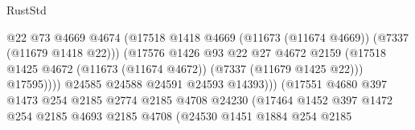\begin{lexlean}{RustStd}
\begin{coremodule}
                                                @22
                                                @73
                                                @4669
                                                @4674
                                                (@17518
                                                  @1418
                                                  @4669
                                                  (@11673 (@11674 @4669))
                                                  (@7337 (@11679 @1418 @22)))
                                                (@17576
                                                  @1426
                                                  @93
                                                  @22
                                                  @27
                                                  @4672
                                                  @2159
                                                  (@17518
                                                    @1425
                                                    @4672
                                                    (@11673 (@11674 @4672))
                                                    (@7337 (@11679 @1425 @22)))
                                                  @17595))))
                                          @24585
                                          @24588
                                          @24591
                                          @24593
                                          @14393)))
                                    (@17551
                                      @4680
                                      @397
                                      @1473
                                      @254
                                      @2185
                                      @2774
                                      @2185
                                      @4708
                                      @24230
                                      (@17464
                                        @1452
                                        @397
                                        @1472
                                        @254
                                        @2185
                                        @4693
                                        @2185
                                        @4708
                                        (@24530
                                          @1451
                                          @1884
                                          @254
                                          @2185

\end{coremodule}
\end{lexlean}
